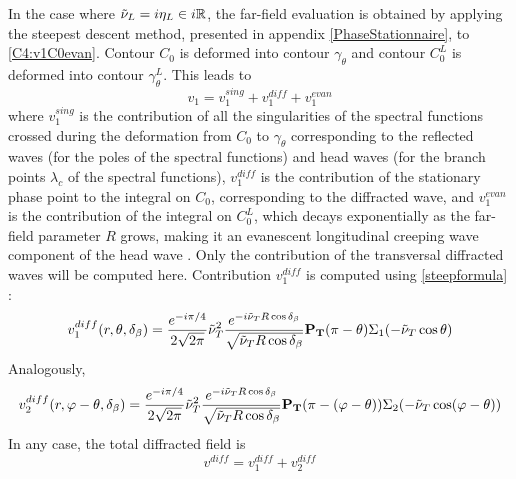 In the case where $\tilde{\nu}_L=i\eta_L \in i\mathbb{R}$, the far-field evaluation is obtained by applying the steepest descent method, presented in appendix \ref{PhaseStationnaire}, to \eqref{C4:v1C0evan}. Contour $C_0$ is deformed into contour $\gamma_{\theta}$ and contour $C_0^L$ is deformed into contour $\gamma_{\theta}^L$. This leads to
\begin{equation}
v_1=v_1^{sing}+v_1^{diff}+v_1^{evan}
\end{equation}
where $v_1^{sing}$ is the contribution of all the singularities of the spectral functions crossed during the deformation from $C_0$ to $\gamma_{\theta}$ corresponding to the reflected waves (for the poles of the spectral functions) and head waves (for the branch points $\lambda_c$ of the spectral functions), $v_1^{diff}$ is the contribution of the stationary phase point to the integral on $C_0$, corresponding to the diffracted wave, and $v_1^{evan}$ is the contribution of the integral on $C_0^L$, which decays exponentially as the far-field parameter $R$ grows, making it an evanescent longitudinal creeping wave component of the head wave \cite{Zernovcrit}. Only the contribution of the transversal diffracted waves will be computed here. Contribution $v_1^{diff}$ is computed using \eqref{steepformula} :
\begin{equation}
v_1^{diff}(r,\theta,\delta_{\beta})=\frac{e^{-i\pi/4}}{2\sqrt{2\pi}}\tilde{\nu}_T^2\frac{e^{-i\tilde{\nu}_TR\cos\delta_{\beta}}}{\sqrt{\tilde{\nu}_TR\cos\delta_{\beta}}}\mathbf{P_T}(\pi-\theta)\Sigma_1(-\tilde{\nu}_T\cos\theta)
\end{equation}
Analogously,
\begin{equation}
v_2^{diff}(r,\varphi-\theta,\delta_{\beta})=\frac{e^{-i\pi/4}}{2\sqrt{2\pi}}\tilde{\nu}_T^2\frac{e^{-i\tilde{\nu}_TR\cos\delta_{\beta}}}{\sqrt{\tilde{\nu}_TR\cos\delta_{\beta}}}\mathbf{P_T}(\pi-(\varphi-\theta))\Sigma_2(-\tilde{\nu}_T\cos(\varphi-\theta))
\end{equation}
In any case, the total diffracted field is
\begin{equation}
v^{diff}=v_1^{diff}+v_2^{diff}
\end{equation}

